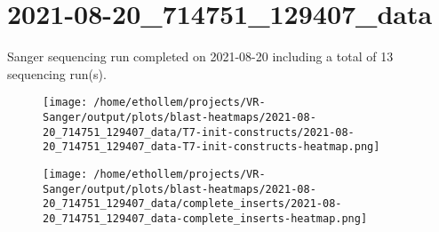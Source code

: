 \section{2021-08-20\_714751\_129407\_data}

    Sanger sequencing run completed on 2021-08-20
    including a total of 13 sequencing
    run(s).
    

    \begin{figure}[!h]
        \texttt{[image: /home/ethollem/projects/VR-Sanger/output/plots/blast-heatmaps/2021-08-20\_714751\_129407\_data/T7-init-constructs/2021-08-20\_714751\_129407\_data-T7-init-constructs-heatmap.png]}
        \centering
    \end{figure}


    \begin{figure}[!h]
        \texttt{[image: /home/ethollem/projects/VR-Sanger/output/plots/blast-heatmaps/2021-08-20\_714751\_129407\_data/complete\_inserts/2021-08-20\_714751\_129407\_data-complete\_inserts-heatmap.png]}
        \centering
    \end{figure}

\pagebreak